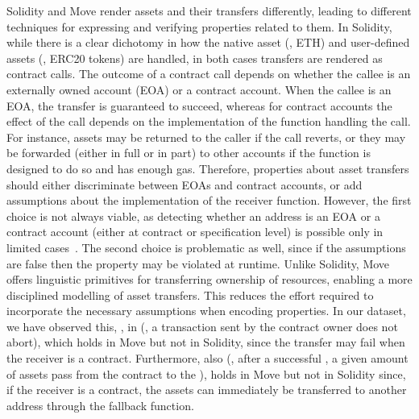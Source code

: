  \label{sec:comparison:language:assetTransfer}
%
Solidity and Move render assets and their transfers differently, leading to different techniques for expressing and verifying properties related to them.
In Solidity, while there is a clear dichotomy in how the native asset (\ie, ETH) and user-defined assets (\eg, ERC20 tokens) are handled, in both cases transfers are rendered as contract calls.
The outcome of a contract call depends on whether the callee is an externally owned account (EOA) or a contract account.
When the callee is an EOA, the transfer is guaranteed to succeed, whereas for contract accounts the effect of the call depends on the implementation of the function handling the call.
For instance, assets may be returned to the caller if the call reverts, 
or they may be forwarded (either in full or in part) to other accounts if the function is designed to do so and has enough gas.
Therefore, properties about asset transfers should either discriminate between EOAs and contract accounts, %
or add assumptions about the implementation of the receiver function.
%
However, the first choice is not always viable, as detecting whether an address is an EOA or a contract account (either at contract or specification level) is possible only in limited cases~\cite{openzeppelin-eoa,BFMPS24fmbc}.
The second choice is problematic as well, since if the assumptions are false then the property may be violated at runtime.
%
Unlike Solidity, Move offers linguistic primitives for transferring ownership of resources, enabling a more disciplined modelling of asset transfers. 
This reduces the effort required to incorporate the necessary assumptions when encoding properties.
In our dataset, we have observed this, \eg, in  (\ie, a  transaction sent by the contract owner does not abort), which holds in Move but not in Solidity, since the transfer may fail when the receiver is a contract.
Furthermore, also  (\ie, after a successful , a given amount of assets pass from the contract to the ), holds in Move but not in Solidity since, if the receiver is a contract, the assets can immediately be transferred to another address through the fallback function.   


